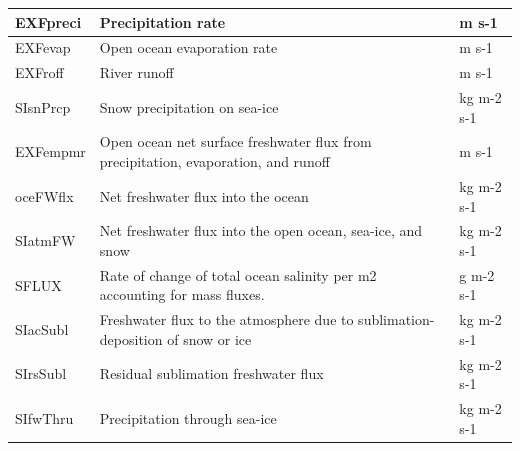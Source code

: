 \begin{longtable}{|m{}|m{}|m{}|}
EXFpreci &Precipitation rate &m s-1  \\ \hline
EXFevap &Open ocean evaporation rate &m s-1  \\ \hline
EXFroff &River runoff &m s-1  \\ \hline
SIsnPrcp &Snow precipitation on sea-ice &kg m-2 s-1  \\ \hline
EXFempmr &Open ocean net surface freshwater flux from precipitation, evaporation, and runoff &m s-1  \\ \hline
oceFWflx &Net freshwater flux into the ocean &kg m-2 s-1  \\ \hline
SIatmFW &Net freshwater flux into the open ocean, sea-ice, and snow &kg m-2 s-1  \\ \hline
SFLUX &Rate of change of total ocean salinity per m2 accounting for mass fluxes. &g m-2 s-1  \\ \hline
SIacSubl &Freshwater flux to the atmosphere due to sublimation-deposition of snow or ice &kg m-2 s-1  \\ \hline
SIrsSubl &Residual sublimation freshwater flux &kg m-2 s-1  \\ \hline
SIfwThru &Precipitation through sea-ice &kg m-2 s-1  \\ \hline
\end{longtable}

\newp
\pagebreak
